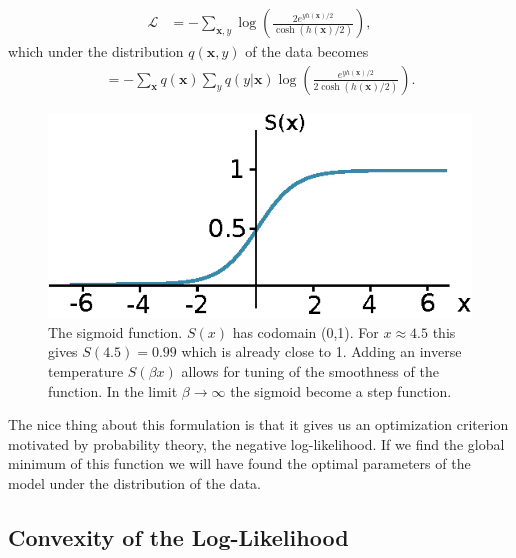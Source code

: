 \begin{align*}
    \mathcal{L} &= - \sum_{\mathbf{x},y} \log(\frac{2e^{y h(\mathbf{x})/2}}{\cosh(h(\mathbf{x})/2)}),
\end{align*}
which under the distribution $q(\mathbf{x},y)$ of the data becomes
\begin{align}
    =  -\sum_{\mathbf{x}} q(\mathbf{x}) \sum_y q(y|\mathbf{x}) \log(\frac{e^{y h(\mathbf{x})/2}}{2 \cosh(h(\mathbf{x})/2)})  \label{eq:nll}.
\end{align}
\begin{figure}
    \centering
    \includegraphics[width=\textwidth]{figures/chapter3/sigmoid.eps}
    \caption{The sigmoid function. $S(x)$ has codomain (0,1). For $x\approx4.5$ this gives $S(4.5) = 0.99$  which is already close to 1. Adding an inverse temperature $S(\beta x)$ allows for tuning of the smoothness of the function. In the limit $\beta \to \infty$ the sigmoid become a step function.}
    \label{fig:sigmoid}
\end{figure}

\noindent The nice thing about this formulation is that it gives us an optimization criterion motivated by probability theory, the negative log-likelihood. If we find the global minimum of this function we will have found the optimal parameters of the model under the distribution of the data.

\subsection{Convexity of the Log-Likelihood}\label{sec:convexity_lh}

